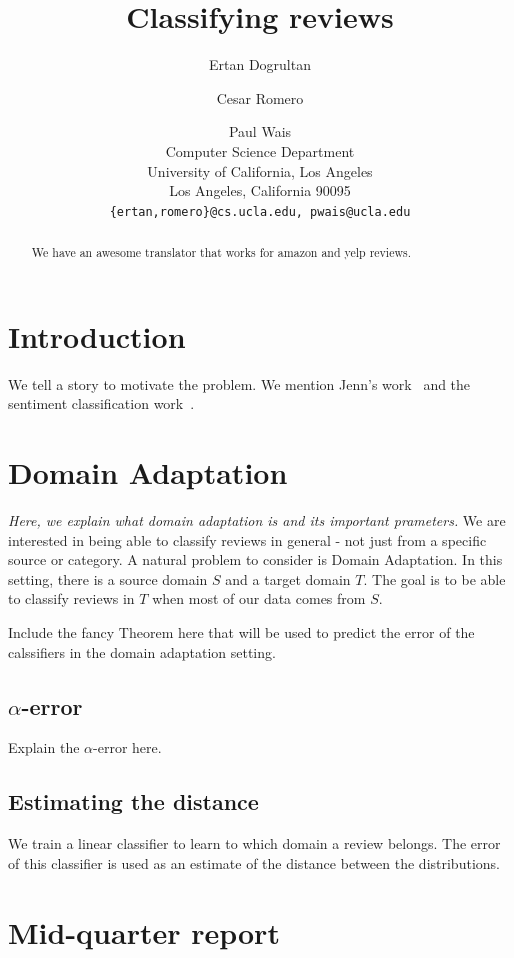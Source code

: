 \documentclass[letterpaper]{article}
\title{Classifying reviews}
\author{Ertan Dogrultan \and Cesar Romero \and Paul Wais\\
Computer Science Department \\
University of California, Los Angeles\\
Los Angeles, California 90095\\
\texttt{\{ertan,romero\}@cs.ucla.edu, pwais@ucla.edu}}
\begin{document}
\maketitle{}
\begin{abstract}
  We have an awesome translator that works for amazon and yelp reviews.
\end{abstract}

\section{Introduction}
\label{sec:introduction}

We tell a story to motivate the problem. We mention Jenn's
work~\cite{JennLearnDiffDomains} and the sentiment classification
work~\cite{PangSentimentClassification}.

\section{Domain Adaptation}
\label{sec:background}

\emph{Here, we explain what domain adaptation is and its important
prameters.}
We are interested in being able to classify reviews in general - not
just from a specific source or category. A natural problem to consider
is Domain Adaptation. In this setting, there is a source domain $S$
and a target domain $T$. The goal is to be able to classify reviews in
$T$ when most of our data comes from $S$. 

Include the fancy Theorem here that will be used to predict the error
of the calssifiers in the domain adaptation setting.

\subsection{$\alpha$-error}
\label{sec:alpha-error}

Explain the $\alpha$-error here.

\subsection{Estimating the distance}
\label{sec:estimating-distance}

We train a linear classifier to learn to which domain a review
belongs. The error of this classifier is used as an estimate of the
distance between the distributions.

\section{Mid-quarter report}
\label{sec:mid-quarter-report}
\end{document}
